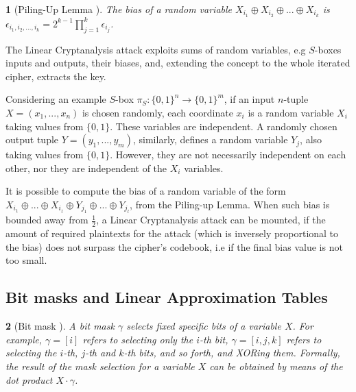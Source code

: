 \documentclass{report}
\newtheorem*{concept}{}{\bfseries}{\itshape}
\begin{document}
\begin{concept}[Piling-Up Lemma \cite{Matsui1993LinearCM}]
The bias of a random variable $X_{i_1} \oplus X_{i_2} \oplus ... \oplus X_{i_k}$ is $\epsilon_{i_1, i_2, ..., i_k} = 2^{k-1} \prod_{j=1}^{k} \epsilon_{i_j}$.
\end{concept}

The Linear Cryptanalysis attack exploits sums of random variables, e.g $S$-boxes inputs and outputs, their biases, and, extending the concept to the whole iterated cipher, extracts the key. 

Considering an example $S$-box $\pi_S : \{0,1\}^n \rightarrow \{0,1\}^m$, if an input $n$-tuple $X = (x_1, ..., x_n)$ is chosen randomly, each coordinate $x_i$ is a random variable $X_i$ taking values from $\{0,1 \}$. These variables are independent. A randomly chosen output tuple $Y = (y_1, ..., y_m)$, similarly, defines a random variable $Y_j$, also taking values from $\{0,1 \}$. However, they are not necessarily independent on each other, nor they are independent of the $X_i$ variables.







It is possible to compute the bias of a random variable of the form $X_{i_1} \oplus ... \oplus X_{i_z} \oplus Y_{j_1} \oplus ... \oplus Y_{j_l}$, from the Piling-up Lemma. When such bias is bounded away from $\frac{1}{2}$, a Linear Cryptanalysis attack can be mounted, if the amount of required plaintexts for the attack (which is inversely proportional to the bias) does not surpass the cipher's codebook, i.e if the final bias value is not too small.

\subsection{Bit masks and Linear Approximation Tables}

\begin{concept}[Bit mask \cite{Matsui1993LinearCM}]
A bit mask $\gamma$ selects fixed specific bits of a variable $X$. For example, $\gamma = [i]$ refers to selecting only the $i$-th bit, $\gamma = [i, j, k]$ refers to selecting the $i$-th, $j$-th and $k$-th bits, and so forth, and XORing them. Formally, the result of the mask selection for a variable $X$ can be obtained by means of the \emph{dot product} $X \cdot \gamma$.
\end{concept}
\end{document}
